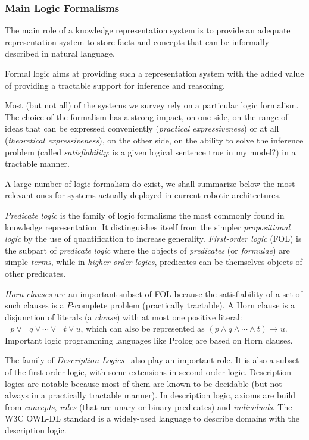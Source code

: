 \subsubsection{Main Logic Formalisms}

The main role of a knowledge representation system is to provide an adequate
representation system to store facts and concepts that can be informally
described in natural language.

Formal logic aims at providing such a representation system with the added
value of providing a tractable support for inference and reasoning.

Most (but not all) of the systems we survey rely on a particular logic
formalism. The choice of the formalism has a strong impact, on one side, on the
range of ideas that can be expressed conveniently (\emph{practical
expressiveness}) or at all (\emph{theoretical expressiveness}), on the other
side, on the ability to solve the inference problem (called
\emph{satisfiability}: is a given logical sentence true in my model?) in a
tractable manner.

A large number of logic formalism do exist, we shall summarize below the most
relevant ones for systems actually deployed in current robotic architectures.

\emph{Predicate logic} is the family of logic formalisms the most commonly
found in knowledge representation. It distinguishes itself from the simpler
\emph{propositional logic} by the use of quantification to increase generality.
\emph{First-order logic} (FOL) is the subpart of \emph{predicate logic} where the
objects of \emph{predicates} (or \emph{formulae}) are simple \emph{terms},
while in \emph{higher-order logics}, predicates can be themselves objects of
other predicates.

\emph{Horn clauses} are an important subset of FOL because the satisfiability
of a set of such clauses is a $P$-complete problem (\ie practically tractable).
A Horn clause is a disjunction of literals (a \emph{clause}) with at most one
positive literal: $\neg p \lor \neg q \lor \cdots \lor \neg t \lor u$, which
can also be represented as $(p \land q \land \cdots \land t) \rightarrow u$.
Important logic programming languages like Prolog are based on Horn clauses.

The family of \emph{Description Logics}~\cite{Baader2008} also play an
important role. It is also a subset of the first-order logic, with some
extensions in second-order logic. Description logics are notable because most
of them are known to be decidable (but not always in a practically tractable
manner). In description logic, axioms are build from \emph{concepts},
\emph{roles} (that are unary or binary predicates) and \emph{individuals}. The
W3C OWL-DL standard is a widely-used language to describe domains with the
description logic.


